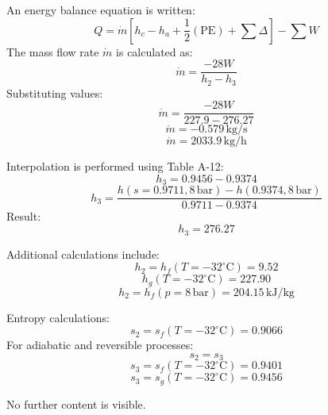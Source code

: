 An energy balance equation is written:  
\[
Q = \dot{m} \left[ h_c - h_a + \frac{1}{2} (\text{PE}) + \sum \Delta \right] - \sum W
\]  
The mass flow rate \( \dot{m} \) is calculated as:  
\[
\dot{m} = \frac{-28W}{h_2 - h_3}
\]  
Substituting values:  
\[
\dot{m} = \frac{-28W}{227.9 - 276.27}
\]  
\[
\dot{m} = -0.579 \, \text{kg/s}
\]  
\[
\dot{m} = 2033.9 \, \text{kg/h}
\]  

Interpolation is performed using Table A-12:  
\[
h_3 = 0.9456 - 0.9374
\]  
\[
h_3 = \frac{h(s=0.9711, 8 \, \text{bar}) - h(0.9374, 8 \, \text{bar})}{0.9711 - 0.9374}
\]  
Result:  
\[
h_3 = 276.27
\]  

Additional calculations include:  
\[
h_2 = h_f(T=-32^\circ\text{C}) = 9.52
\]  
\[
h_g(T=-32^\circ\text{C}) = 227.90
\]  
\[
h_2 = h_f(p=8 \, \text{bar}) = 204.15 \, \text{kJ/kg}
\]  

Entropy calculations:  
\[
s_2 = s_f(T=-32^\circ\text{C}) = 0.9066
\]  
For adiabatic and reversible processes:  
\[
s_2 = s_3
\]  
\[
s_3 = s_f(T=-32^\circ\text{C}) = 0.9401
\]  
\[
s_3 = s_g(T=-32^\circ\text{C}) = 0.9456
\]  

No further content is visible.